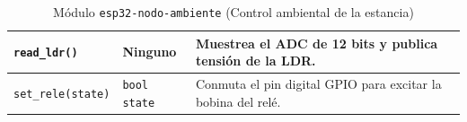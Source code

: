 \begin{table}[H]
{\begin{tabular}{|l|l|l|}
        \texttt{read\_ldr()} & Ninguno & \parbox[c]{7.5cm}{\vspace{0.15cm}Muestrea el ADC de 12 bits y publica tensión de la LDR.\vspace{0.15cm}} \\ \hline
        \texttt{set\_rele(state)} & \texttt{bool state} & \parbox[c]{7.5cm}{\vspace{0.15cm}Conmuta el pin digital GPIO para excitar la bobina del relé.\vspace{0.15cm}} \\ \hline
    \end{tabular}
    }
    \caption{Módulo \texttt{esp32-nodo-ambiente} (Control ambiental de la estancia)}
    \label{tab:mod_nodo_ambiente}

\end{table}

